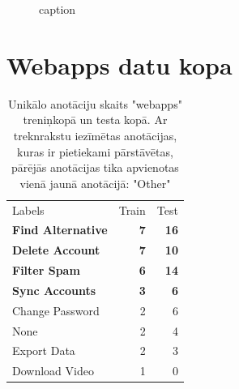 \begin{figure}[h] 
   \centering
   \caption{caption} 
   \label{fig:askubuntu-xlm-all}
\end{figure}



\section{Webapps datu kopa}


\begin{table}[htbp]
  \centering
  \caption{Unikālo anotāciju skaits "webapps" treniņkopā un testa kopā. Ar treknrakstu iezīmētas anotācijas, kuras ir pietiekami pārstāvētas, pārējās anotācijas tika apvienotas vienā jaunā anotācijā: "Other"}
    \begin{tabular}{lrr}
    Labels & Train & Test \\
    \textbf{Find Alternative} & \textbf{7} & \textbf{16} \\
    \textbf{Delete Account} & \textbf{7} & \textbf{10} \\
    \textbf{Filter Spam} & \textbf{6} & \textbf{14} \\
    \textbf{Sync Accounts} & \textbf{3} & \textbf{6} \\
    Change Password & 2     & 6 \\
    None  & 2     & 4 \\
    Export Data & 2     & 3 \\
    Download Video & 1     & 0 \\
    \end{tabular}%
  \label{tab:webapps-labels}%
\end{table}%


